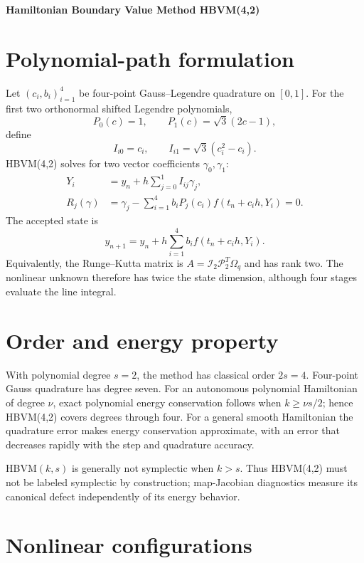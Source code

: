\documentclass[11pt,a4paper]{article}
\begin{document}
\begin{center}
 {\LARGE\bfseries\color{gcblue}Hamiltonian Boundary Value Method HBVM(4,2)}\par
 \vspace{0.35em}{\large Rank-two polynomial path with four Gauss nodes}
\end{center}

\section{Polynomial-path formulation}

Let $(c_i,b_i)_{i=1}^4$ be four-point Gauss--Legendre quadrature on $[0,1]$.
For the first two orthonormal shifted Legendre polynomials,
\[
P_0(c)=1,\qquad P_1(c)=\sqrt3(2c-1),
\]
define
\[
I_{i0}=c_i,\qquad I_{i1}=\sqrt3(c_i^2-c_i).
\]
HBVM(4,2) solves for two vector coefficients $\gamma_0,\gamma_1$:
\begin{align}
Y_i&=y_n+h\sum_{j=0}^1I_{ij}\gamma_j,\\
R_j(\gamma)&=\gamma_j-
\sum_{i=1}^4b_iP_j(c_i)f(t_n+c_ih,Y_i)=0.
\end{align}
The accepted state is
\[
y_{n+1}=y_n+h\sum_{i=1}^4b_i f(t_n+c_ih,Y_i).
\]
Equivalently, the Runge--Kutta matrix is
$A=\mathcal I_2\mathcal P_2^T\Omega_q$ and has rank two.  The nonlinear
unknown therefore has twice the state dimension, although four stages evaluate
the line integral.

\section{Order and energy property}

With polynomial degree $s=2$, the method has classical order $2s=4$.
Four-point Gauss quadrature has degree seven.  For an autonomous polynomial
Hamiltonian of degree $\nu$, exact polynomial energy conservation follows when
$k\geq\nu s/2$; hence HBVM(4,2) covers degrees through four.  For a general
smooth Hamiltonian the quadrature error makes energy conservation approximate,
with an error that decreases rapidly with the step and quadrature accuracy.

HBVM$(k,s)$ is generally not symplectic when $k>s$.  Thus HBVM(4,2) must not be
labeled symplectic by construction; map-Jacobian diagnostics measure its
canonical defect independently of its energy behavior.

\section{Nonlinear configurations}
\end{document}
